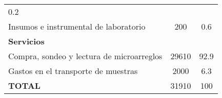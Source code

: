 \documentclass[a4paper]{article}
\begin{document}
\begin{longtable}[]{@{}lcc@{}}
\begin{minipage}[t]{0.23\columnwidth}
0.2\strut
\end{minipage}\tabularnewline
\begin{minipage}[t]{0.44\columnwidth}\raggedright\strut
Insumos e instrumental de laboratorio\strut
\end{minipage} & \begin{minipage}[t]{0.23\columnwidth}\centering\strut
200\strut
\end{minipage} & \begin{minipage}[t]{0.23\columnwidth}\centering\strut
0.6\strut
\end{minipage}\tabularnewline
\begin{minipage}[t]{0.44\columnwidth}\raggedright\strut
\textbf{Servicios}\strut
\end{minipage} & \begin{minipage}[t]{0.23\columnwidth}\centering\strut
\strut
\end{minipage} & \begin{minipage}[t]{0.23\columnwidth}\centering\strut
\strut
\end{minipage}\tabularnewline
\begin{minipage}[t]{0.44\columnwidth}\raggedright\strut
Compra, sondeo y lectura de microarreglos\strut
\end{minipage} & \begin{minipage}[t]{0.23\columnwidth}\centering\strut
29610\strut
\end{minipage} & \begin{minipage}[t]{0.23\columnwidth}\centering\strut
92.9\strut
\end{minipage}\tabularnewline
\begin{minipage}[t]{0.44\columnwidth}\raggedright\strut
Gastos en el transporte de muestras\strut
\end{minipage} & \begin{minipage}[t]{0.23\columnwidth}\centering\strut
2000\strut
\end{minipage} & \begin{minipage}[t]{0.23\columnwidth}\centering\strut
6.3\strut
\end{minipage}\tabularnewline
\begin{minipage}[t]{0.44\columnwidth}\raggedright\strut
\textbf{TOTAL}\strut
\end{minipage} & \begin{minipage}[t]{0.23\columnwidth}\centering\strut
31910\strut
\end{minipage} & \begin{minipage}[t]{0.23\columnwidth}\centering\strut
100\strut
\end{minipage}\tabularnewline
\bottomrule
\end{longtable}
\end{document}
